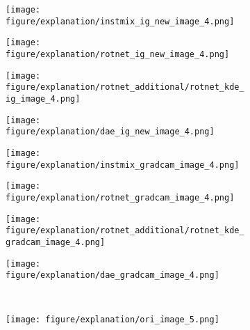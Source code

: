 \documentclass{article} \usepackage{iclr2021_conference,times}
\begin{document}
\begin{figure}[h!]
\begin{subfigure}{.11\textwidth}
  \centering
  \texttt{[image: figure/explanation/instmix\_ig\_new\_image\_4.png]}
\end{subfigure}
\hspace{-2mm}
\begin{subfigure}{.11\textwidth}
  \centering
  \texttt{[image: figure/explanation/rotnet\_ig\_new\_image\_4.png]}
\end{subfigure}
\hspace{-2mm}
\begin{subfigure}{.11\textwidth}
  \centering
  \texttt{[image: figure/explanation/rotnet\_additional/rotnet\_kde\_ig\_image\_4.png]}
\end{subfigure}
\hspace{-2mm}
\begin{subfigure}{.11\textwidth}
  \centering
  \texttt{[image: figure/explanation/dae\_ig\_new\_image\_4.png]}
\end{subfigure}
\hspace{-2mm}
\begin{subfigure}{.11\textwidth}
  \centering
  \texttt{[image: figure/explanation/instmix\_gradcam\_image\_4.png]}
\end{subfigure}
\hspace{-2mm}
\begin{subfigure}{.11\textwidth}
  \centering
  \texttt{[image: figure/explanation/rotnet\_gradcam\_image\_4.png]}
\end{subfigure}
\hspace{-2mm}
\begin{subfigure}{.11\textwidth}
  \centering
  \texttt{[image: figure/explanation/rotnet\_additional/rotnet\_kde\_gradcam\_image\_4.png]}
\end{subfigure}
\hspace{-2mm}
\begin{subfigure}{.11\textwidth}
  \centering
  \texttt{[image: figure/explanation/dae\_gradcam\_image\_4.png]}
\end{subfigure}\\
\begin{subfigure}{.11\textwidth}
  \centering
  \texttt{[image: figure/explanation/ori\_image\_5.png]}
\end{subfigure}
\hspace{-2mm}
\begin{subfigure}{.11\textwidth}

\end{subfigure}
\end{figure}
\end{document}
